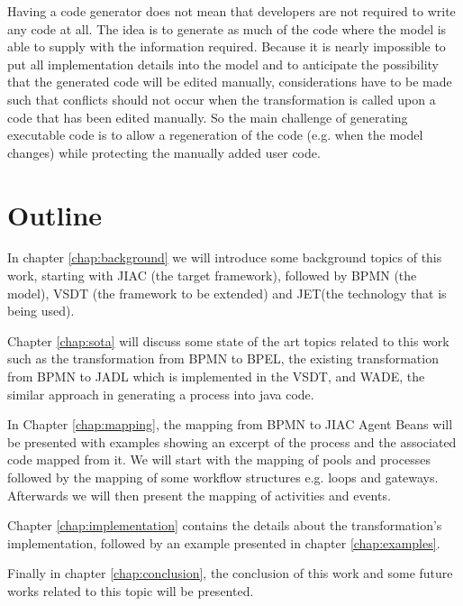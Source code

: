 Having a code generator does not mean that developers are not required to write any code at all. The idea is to generate as much of the code where the model is able to supply with the information required. Because it is nearly impossible to put all implementation details into the model and to anticipate the possibility that the generated code will be edited manually, considerations have to be made such that conflicts should not occur when the transformation is called upon a code that has been edited manually. So the main challenge of generating executable code is to allow a regeneration of the code (e.g. when the model changes) while protecting the manually added user code. 


\section{Outline}
In chapter \ref{chap:background} we will introduce some background topics of this work, starting with JIAC (the target framework), followed by BPMN (the model), VSDT (the framework to be extended) and JET(the technology that is being used).

Chapter \ref{chap:sota} will discuss some state of the art topics related to this work such as the transformation from BPMN to BPEL, the existing transformation from BPMN to JADL which is implemented in the VSDT, and WADE, the similar approach in generating a process into java code.

In Chapter \ref{chap:mapping}, the mapping from BPMN to JIAC Agent Beans will be presented with examples showing an excerpt of the process and the associated code mapped from it. We will start with the mapping of pools and processes followed by the mapping of some workflow structures e.g. loops and gateways. Afterwards we will then present the mapping of activities and events.

Chapter \ref{chap:implementation} contains the details about the transformation's implementation, followed by an example presented in chapter \ref{chap:examples}. 

Finally in chapter \ref{chap:conclusion}, the conclusion of this work and some future works related to this topic will be presented.